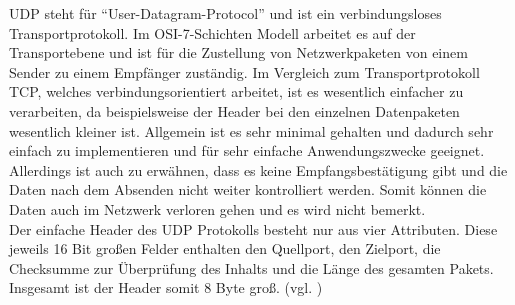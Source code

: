 \ac{UDP} steht für ``User-Datagram-Protocol'' und ist ein verbindungsloses Transportprotokoll. Im \ac{OSI}-7-Schichten Modell arbeitet es auf der Transportebene und ist für die Zustellung von Netzwerkpaketen von einem Sender zu einem Empfänger zuständig. Im Vergleich zum Transportprotokoll \ac{TCP}, welches verbindungsorientiert arbeitet, ist es wesentlich einfacher zu verarbeiten, da beispielsweise der Header bei den einzelnen Datenpaketen wesentlich kleiner ist. Allgemein ist es sehr minimal gehalten und dadurch sehr einfach zu implementieren und für sehr einfache Anwendungszwecke geeignet. Allerdings ist auch zu erwähnen, dass es keine Empfangsbestätigung gibt und die Daten nach dem Absenden nicht weiter kontrolliert werden. Somit können die Daten auch im Netzwerk verloren gehen und es wird nicht bemerkt. \\
Der einfache Header des \ac{UDP} Protokolls besteht nur aus vier Attributen. Diese jeweils 16 Bit großen Felder enthalten den Quellport, den Zielport, die Checksumme zur Überprüfung des Inhalts und die Länge des gesamten Pakets. Insgesamt ist der Header somit 8 Byte groß. (vgl. \cite{ElektronikKompendium.}\cite{.}\cite{.23.02.2016})
 